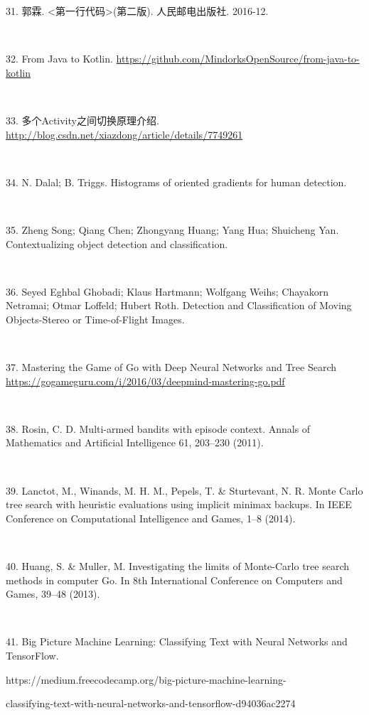 \documentclass[UTF8, Microsoft YaHei]{book}
\begin{document}
    31. 郭霖. <第一行代码>(第二版). 人民邮电出版社. 2016-12.

    ~

    32. From Java to Kotlin. \url{https://github.com/MindorksOpenSource/from-java-to-kotlin}

    ~

    33. 多个Activity之间切换原理介绍.  \url{http://blog.csdn.net/xiazdong/article/details/7749261}

    ~

    34. N. Dalal; B. Triggs. Histograms of oriented gradients for human detection.

    ~

    35. Zheng Song; Qiang Chen; Zhongyang Huang; Yang Hua; Shuicheng Yan. Contextualizing object detection and classification.

    ~

    36. Seyed Eghbal Ghobadi; Klaus Hartmann; Wolfgang Weihs; Chayakorn Netramai; Otmar Loffeld; Hubert Roth.  Detection and Classification of Moving Objects-Stereo or Time-of-Flight Images.

    ~

    37. Mastering the Game of Go with Deep Neural Networks and Tree Search  \url{https://gogameguru.com/i/2016/03/deepmind-mastering-go.pdf}

    ~

    38. Rosin, C. D. Multi-armed bandits with episode context. Annals of Mathematics and Artificial Intelligence 61, 203–230 (2011).

    ~

    39. Lanctot, M., Winands, M. H. M., Pepels, T. \& Sturtevant, N. R. Monte Carlo tree search with heuristic evaluations using implicit minimax backups. In IEEE Conference on Computational Intelligence and Games, 1–8 (2014).

    ~

    40. Huang, S. \& Muller, M. Investigating the limits of Monte-Carlo tree search methods in computer Go. In 8th International Conference on Computers and Games, 39–48 (2013).

    ~

    41. Big Picture Machine Learning: Classifying Text with Neural Networks and TensorFlow.            

     	https://medium.freecodecamp.org/big-picture-machine-learning-

     	classifying-text-with-neural-networks-and-tensorflow-d94036ac2274

    ~
\end{document}
